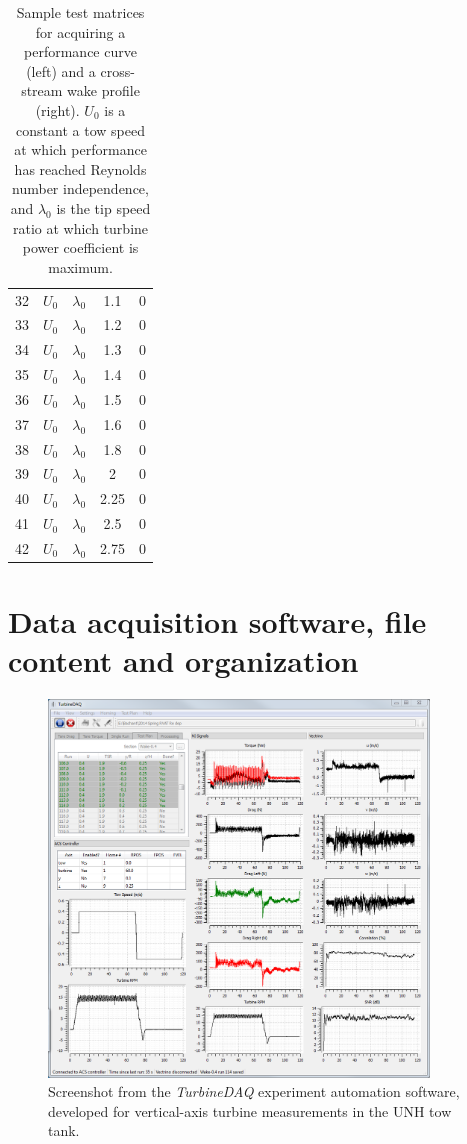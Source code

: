 \documentclass[12pt,letterpaper]{scrreprt}
\begin{document}
\begin{appendices}
\begin{table}[!ht]
{\begin{tabular}{c|c|c|c|c}
32  & $U_0$        & $\lambda_0$ & 1.1   & 0   \\
33  & $U_0$        & $\lambda_0$ & 1.2   & 0   \\
34  & $U_0$        & $\lambda_0$ & 1.3   & 0   \\
35  & $U_0$        & $\lambda_0$ & 1.4   & 0   \\
36  & $U_0$        & $\lambda_0$ & 1.5   & 0   \\
37  & $U_0$        & $\lambda_0$ & 1.6   & 0   \\
38  & $U_0$        & $\lambda_0$ & 1.8   & 0   \\
39  & $U_0$        & $\lambda_0$ & 2     & 0   \\
40  & $U_0$        & $\lambda_0$ & 2.25  & 0   \\
41  & $U_0$        & $\lambda_0$ & 2.5   & 0   \\
42  & $U_0$        & $\lambda_0$ & 2.75  & 0
\end{tabular}}
\caption{Sample test matrices for acquiring a performance curve (left) and a
cross-stream wake profile (right). $U_0$ is a constant a tow speed at which
performance has reached Reynolds number independence, and $\lambda_0$ is the tip
speed ratio at which turbine power coefficient is maximum.}
\label{tab-test_section}
\end{table}


\chapter{Data acquisition software, file content and organization}

\begin{figure}[ht]
\centering
\includegraphics[width=0.9\textwidth]{Figures/TurbineDAQ}
\caption{Screenshot from the \textit{TurbineDAQ} experiment automation software,
developed for vertical-axis turbine measurements in the UNH tow tank.}
\label{fig-turbinedaq}
\end{figure}



\end{appendices}
\end{document}
